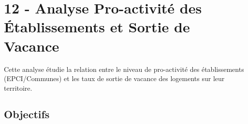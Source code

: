 \documentclass[11pt]{article}
\makeatletter
\newcommand{\boxspacing}{\kern\kvtcb@left@rule\kern\kvtcb@boxsep}
\newcommand{\prompt}[4]{
        {\ttfamily\llap{{\color{#2}[#3]:\hspace{3pt}#4}}\vspace{-\baselineskip}}
    }
\makeatother
\begin{document}
    \begin{tcolorbox}[breakable, size=fbox, boxrule=1pt, pad at break*=1mm,colback=cellbackground, colframe=cellborder]
\prompt{In}{incolor}{ }{\boxspacing}
\begin{Verbatim}[commandchars=\\\{\}]

\end{Verbatim}
\end{tcolorbox}

    \begin{tcolorbox}[breakable, size=fbox, boxrule=1pt, pad at break*=1mm,colback=cellbackground, colframe=cellborder]
\prompt{In}{incolor}{ }{\boxspacing}
\begin{Verbatim}[commandchars=\\\{\}]

\end{Verbatim}
\end{tcolorbox}

    \begin{tcolorbox}[breakable, size=fbox, boxrule=1pt, pad at break*=1mm,colback=cellbackground, colframe=cellborder]
\prompt{In}{incolor}{ }{\boxspacing}
\begin{Verbatim}[commandchars=\\\{\}]

\end{Verbatim}
\end{tcolorbox}

    \begin{tcolorbox}[breakable, size=fbox, boxrule=1pt, pad at break*=1mm,colback=cellbackground, colframe=cellborder]
\prompt{In}{incolor}{ }{\boxspacing}
\begin{Verbatim}[commandchars=\\\{\}]

\end{Verbatim}
\end{tcolorbox}

    \section{12 - Analyse Pro-activité des Établissements et Sortie de
Vacance}\label{analyse-pro-activituxe9-des-uxe9tablissements-et-sortie-de-vacance}

Cette analyse étudie la relation entre le niveau de pro-activité des
établissements (EPCI/Communes) et les taux de sortie de vacance des
logements sur leur territoire.

\subsection{Objectifs}\label{objectifs}
\end{document}
